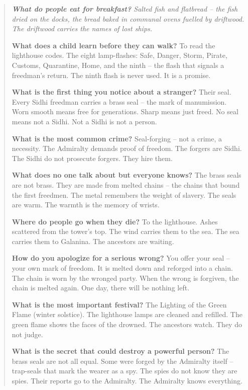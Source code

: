 \documentclass[12pt,oneside]{book}
\newenvironment{almanac}
  {\begin{quote}\small\itshape}
  {\end{quote}}
\begin{document}
\vspace{1em}
\begin{almanac}
\textbf{What do people eat for breakfast?} Salted fish and flatbread -- the fish dried on the docks, the bread baked in communal ovens fuelled by driftwood. The driftwood carries the names of lost ships.

\textbf{What does a child learn before they can walk?} To read the lighthouse codes. The eight lamp-flashes: Safe, Danger, Storm, Pirate, Customs, Quarantine, Home, and the ninth -- the flash that signals a freedman's return. The ninth flash is never used. It is a promise.

\textbf{What is the first thing you notice about a stranger?} Their seal. Every Sidhi freedman carries a brass seal -- the mark of manumission. Worn smooth means free for generations. Sharp means just freed. No seal means not a Sidhi. Not a Sidhi is not a person.

\textbf{What is the most common crime?} Seal-forging -- not a crime, a necessity. The Admiralty demands proof of freedom. The forgers are Sidhi. The Sidhi do not prosecute forgers. They hire them.

\textbf{What does no one talk about but everyone knows?} The brass seals are not brass. They are made from melted chains -- the chains that bound the first freedmen. The metal remembers the weight of slavery. The seals are warm. The warmth is the memory of wrists.

\textbf{Where do people go when they die?} To the lighthouse. Ashes scattered from the tower's top. The wind carries them to the sea. The sea carries them to Galanina. The ancestors are waiting.

\textbf{How do you apologize for a serious wrong?} You offer your seal -- your own mark of freedom. It is melted down and reforged into a chain. The chain is worn by the wronged party. When the wrong is forgiven, the chain is melted again. One day, there will be nothing left.

\textbf{What is the most important festival?} The Lighting of the Green Flame (winter solstice). The lighthouse lamps are cleaned and refilled. The green flame shows the faces of the drowned. The ancestors watch. They do not judge.

\textbf{What is the secret that could destroy a powerful person?} The brass seals are not all equal. Some were forged by the Admiralty itself -- trap-seals that mark the wearer as a spy. The spies do not know they are spies. Their reports go to the Admiralty. The Admiralty knows everything.
\end{almanac}
\end{document}
